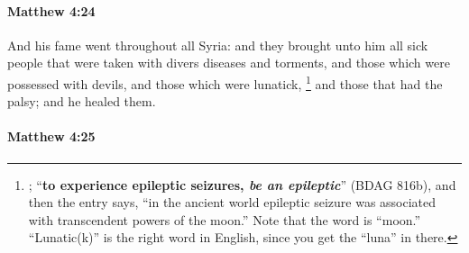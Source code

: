 		\paragraph{Matthew 4:24} %
			\label{MATTHEW-4-24}

			And his fame went throughout all Syria: and they brought unto him all sick people that were taken with divers diseases and torments, and those which were possessed with devils, and those which were lunatick,%
				\footnote{%
					; ``\textbf{to experience epileptic seizures, \textit{be an epileptic}}'' (BDAG 816b), and then the entry says, ``in the ancient world epileptic seizure was associated with transcendent powers of the moon.'' Note that the word  is ``moon.'' ``Lunatic(k)'' is the right word in English, since you get the ``luna'' in there.
					}
			and those that had the palsy; and he healed them.

			\begin{framed}
			\scriptsize
				\begin{compactdesc}
					\item[SBLG] 
				\end{compactdesc}
			\end{framed}

		\paragraph{Matthew 4:25} %
			\label{MATTHEW-4-25}

